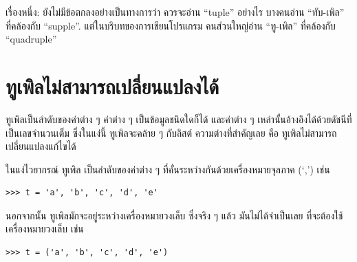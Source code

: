 
เรื่องหนึ่ง: ยังไม่มีข้อตกลงอย่างเป็นทางการว่า ควรจะอ่าน ``tuple'' อย่างไร
บางคนอ่าน ``ทับ-เพิล'' ที่คล้องกับ ``supple''.
แต่ในบริบทของการเขียนโปรแกรม คนส่วนใหญ่อ่าน ``ทู-เพิล'' ที่คล้องกับ ``quadruple''


\section{ทูเพิลไม่สามารถเปลี่ยนแปลงได้}


ทูเพิลเป็นลำดับของค่าต่าง ๆ
ค่าต่าง ๆ เป็นข้อมูลชนิดใดก็ได้
และค่าต่าง ๆ เหล่านั้นอ้างอิงได้ด้วยดัชนีที่เป็นเลขจำนวนเต็ม
ซึ่งในแง่นี้ ทูเพิลจะคล้าย ๆ กับลิสต์
ความต่างที่สำคัญเลย คือ ทูเพิลไม่สามารถเปลี่ยนแปลงแก้ไขได้


ในแง่ไวยากรณ์ ทูเพิล เป็นลำดับของค่าต่าง ๆ ที่คั่นระหว่างกันด้วยเครื่องหมายจุลภาค (`,') เช่น

\begin{verbatim}
>>> t = 'a', 'b', 'c', 'd', 'e'
\end{verbatim}
%

นอกจากนั้น ทูเพิลมักจะอยู่ระหว่างเครื่องหมายวงเล็บ
ซึ่งจริง ๆ แล้ว มันไม่ได้จำเป็นเลย ที่จะต้องใช้เครื่องหมายวงเล็บ เช่น

\begin{verbatim}
>>> t = ('a', 'b', 'c', 'd', 'e')
\end{verbatim}
%

